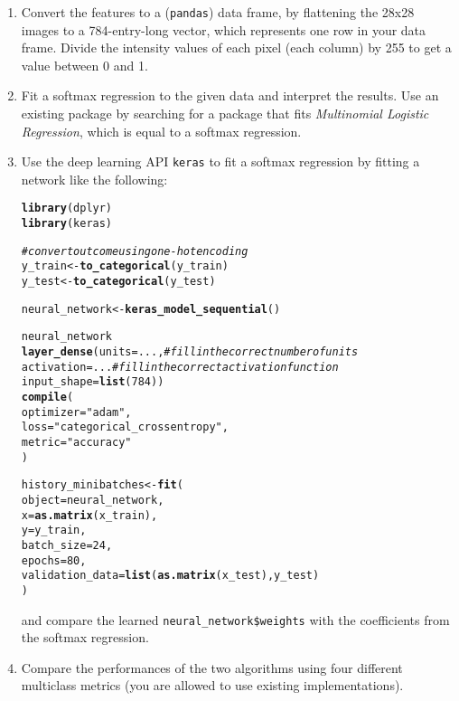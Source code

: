 \documentclass[a4paper]{article}
\makeatletter
\def\maxwidth{ %
  \ifdim\Gin@nat@width>\linewidth
    \linewidth
  \else
    \Gin@nat@width
  \fi
}
\newcommand{\hlstr}[1]{\textcolor[rgb]{0.192,0.494,0.8}{#1}}%
\newcommand{\hlcom}[1]{\textcolor[rgb]{0.678,0.584,0.686}{\textit{#1}}}%
\newcommand{\hlkwd}[1]{\textcolor[rgb]{0.737,0.353,0.396}{\textbf{#1}}}%
\newenvironment{kframe}{%
 \def\at@end@of@kframe{}%
 \ifinner\ifhmode%
  \def\at@end@of@kframe{\end{minipage}}%
  \begin{minipage}{\columnwidth}%
 \fi\fi%
 \def\FrameCommand##1{\hskip\@totalleftmargin \hskip-\fboxsep
 \colorbox{shadecolor}{##1}\hskip-\fboxsep
     \hskip-\linewidth \hskip-\@totalleftmargin \hskip\columnwidth}%
 \MakeFramed {\advance\hsize-\width
   \@totalleftmargin\z@ \linewidth\hsize
   \@setminipage}}%
 {\par\unskip\endMakeFramed%
 \at@end@of@kframe}
\newenvironment{knitrout}{}{} %
\makeatother
\begin{document}
{\begin{enumerate}
\begin{knitrout}
{\centering \texttt{[image: figure/unnamed-chunk-5-1]} 

}


\end{knitrout}
\item Convert the features to a (\texttt{pandas}) data frame, by flattening the 28x28 images to a 784-entry-long vector, which represents one row in your data frame. Divide the intensity values of each pixel (each column) by 255 to get a value between 0 and 1.  



\item Fit a softmax regression to the given data and interpret the results. Use an existing package by searching for a package that fits \textit{Multinomial Logistic Regression}, which is equal to a softmax regression.

\item Use the deep learning API \texttt{keras} to fit a softmax regression by fitting a network like the following:

\begin{knitrout}
\color{fgcolor}\begin{kframe}
\begin{alltt}
\hlkwd{library}(dplyr)
\hlkwd{library}(keras)

\hlcom{# convert outcome using one-hot encoding}
y_train <- \hlkwd{to_categorical}(y_train)
y_test <- \hlkwd{to_categorical}(y_test)

neural_network <- \hlkwd{keras_model_sequential}()

neural_network %>% 
  \hlkwd{layer_dense}(units = ..., \hlcom{# fill in the correct number of units }
              activation = ... \hlcom{# fill in the correct activation function}
              input_shape = \hlkwd{list}(784)) %>% 
  \hlkwd{compile}(
    optimizer = \hlstr{"adam"},
    loss      = \hlstr{"categorical_crossentropy"},
    metric = \hlstr{"accuracy"}
  )

history_minibatches <- \hlkwd{fit}(
  object           = neural_network, 
  x                = \hlkwd{as.matrix}(x_train), 
  y                = y_train,
  batch_size       = 24, 
  epochs           = 80,
  validation_data = \hlkwd{list}(\hlkwd{as.matrix}(x_test), y_test)
)
\end{alltt}
\end{kframe}
\end{knitrout}

and compare the learned \texttt{neural\_network\$weights} with the coefficients from the softmax regression.

\item Compare the performances of the two algorithms using four different multiclass metrics (you are allowed to use existing implementations).

\end{enumerate}
}
\end{document}
